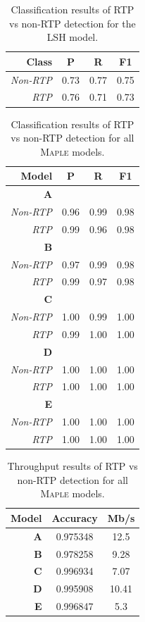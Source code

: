 \begin{table} [h!]
\centering
\begin{tabular}{| r | c | c | c |}
\hline
Class & P & R & F1 \\
\hline
\textit{Non-RTP} & 0.73 & 0.77 & 0.75 \\
\textit{RTP} & 0.76 & 0.71 & 0.73 \\
\hline
\end{tabular}
\caption{Classification results of RTP vs non-RTP detection for the LSH model.}
\label{tab:rtpresultslsh}
\end{table}

\begin{table} [h!]
\centering
\small
\begin{tabular}{| r | c | c | c |}
\hline
Model & P & R & F1 \\
\hline
\textbf{A} &&& \\
\textit{Non-RTP} & 0.96 & 0.99 & 0.98 \\
\textit{RTP} & 0.99 & 0.96 & 0.98 \\
\hline
\textbf{B} &&& \\
\textit{Non-RTP} & 0.97 & 0.99 & 0.98 \\
\textit{RTP} & 0.99 & 0.97 & 0.98 \\
\hline
\textbf{C} &&& \\
\textit{Non-RTP} & 1.00 & 0.99 & 1.00 \\
\textit{RTP} & 0.99 & 1.00 & 1.00 \\
\hline
\textbf{D} &&& \\
\textit{Non-RTP} & 1.00 & 1.00 & 1.00 \\
\textit{RTP} & 1.00 & 1.00 & 1.00 \\
\hline
\textbf{E} &&& \\
\textit{Non-RTP} & 1.00 & 1.00 & 1.00 \\
\textit{RTP} & 1.00 & 1.00 & 1.00 \\
\hline
\end{tabular}
\caption{Classification results of RTP vs non-RTP detection for all \textsc{Maple} models.}
\label{tab:binaryresults}
\end{table}

\begin{table}
\centering
\small
\begin{tabular}{| r | c | c |}
\hline
Model & Accuracy & Mb/s \\
\hline
\textbf{A} & 0.975348 & 12.5 \\
\hline
\textbf{B} & 0.978258 & 9.28 \\
\hline
\textbf{C} & 0.996934 & 7.07 \\
\hline
\textbf{D} & 0.995908 & 10.41 \\
\hline
\textbf{E} & 0.996847 & 5.3 \\
\hline
\end{tabular}
\caption{Throughput results of RTP vs non-RTP detection for all \textsc{Maple} models.}
\label{tab:binarythroughput}
\end{table}

